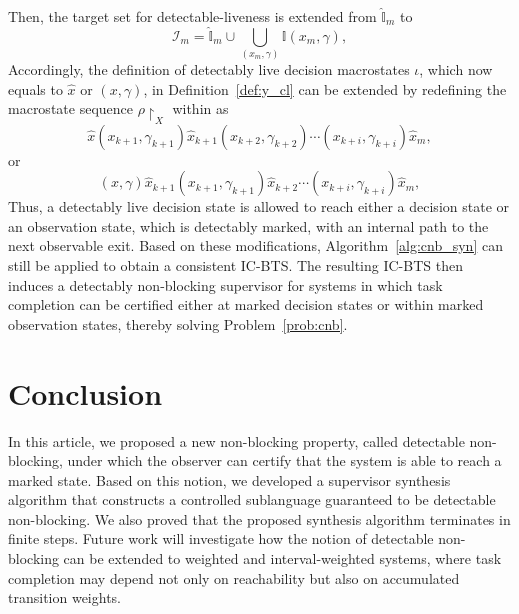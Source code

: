 \documentclass[twocolumn]{autart}
\begin{document}
Then, the target set for detectable-liveness is extended from
$\hat{\mathbb{I}}_m$ to
\begin{equation}\label{eq:extended_target_set}
\mathcal{I}_m
= \hat{\mathbb{I}}_m \cup \bigcup_{(x_m, \gamma)} \mathbb{I}(x_m,\gamma),
\end{equation}
Accordingly, the definition of detectably live decision macrostates $\iota$, which now equals to $\hat{x}$ or $(x, \gamma)$, in Definition~\ref{def:y_cl} can be extended by redefining the macrostate sequence $\rho\restriction_{X}$ within as
\begin{equation}\label{eq:bcc_y_cl:2}
    \hat{x} (x_{k+1}, \gamma_{k+1}) \hat{x}_{k+1} (x_{k+2}, \gamma_{k+2}) \cdots (x_{k+i}, \gamma_{k+i}) \hat{x}_m,    
\end{equation}
or
\begin{equation}\label{eq:bcc_y_cl:3}
    (x, \gamma) \hat{x}_{k+1} (x_{k+1}, \gamma_{k+1}) \hat{x}_{k+2} \cdots (x_{k+i}, \gamma_{k+i}) \hat{x}_m,    
\end{equation}
Thus, a detectably live decision state is allowed to reach either a decision state or an observation state, which is detectably marked, with an internal path to the next observable exit.
Based on these modifications, Algorithm~\ref{alg:cnb_syn} can still be applied to obtain a consistent IC-BTS. 
The resulting IC-BTS then induces a detectably non-blocking supervisor for systems in which task completion can be certified either at marked decision states or within marked observation states, thereby solving Problem~\ref{prob:cnb}.




\section{Conclusion}\label{sec:con}
In this article, we proposed a new non-blocking property, called detectable non-blocking, under which the observer can certify that the system is able to reach a marked state. 
Based on this notion, we developed a supervisor synthesis algorithm that constructs a controlled sublanguage guaranteed to be detectable non-blocking. 
We also proved that the proposed synthesis algorithm terminates in finite steps. 
Future work will investigate how the notion of detectable non-blocking can be extended to weighted and interval-weighted systems, where task completion may depend not only on reachability but also on accumulated transition weights.




\end{document}
